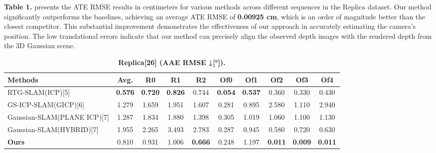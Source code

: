 \documentclass[twocolumn]{article} %
\begin{document}
\textbf{Table 1.} presents the ATE RMSE results in centimeters for
various methods across different sequences in the Replica dataset. Our
method significantly outperforms the baselines, achieving an average ATE
RMSE of \textbf{0.00925 cm}, which is an order of magnitude better than
the closest competitor. This substantial improvement demonstrates the
effectiveness of our approach in accurately estimating the camera's
position. The low translational errors indicate that our method can
precisely align the observed depth images with the rendered depth from
the 3D Gaussian scene.

\begin{table}[htbp]
\renewcommand{\thetable}{\textbf{\arabic{table}}}
\renewcommand{\tablename}{\textbf{Table}}
\centering
\caption{\textbf{Replica[26] (AAE RMSE ↓[°]).}}
\label{table:_textbf_replica_26_a}
\begin{adjustbox}{max width=\columnwidth,max height=!,center}
\begin{tabular}{lccccccccc}
\toprule
\textbf{Methods} & \textbf{Avg.} & \textbf{R0} & \textbf{R1} & \textbf{R2} & \textbf{Of0} & \textbf{Of1} & \textbf{Of2} & \textbf{Of3} & \textbf{Of4}\\
\midrule
RTG-SLAM(ICP)[5] & \cellcolor{green!30}\textbf{0.576} & \cellcolor{green!30}\textbf{0.720} & \cellcolor{green!30}\textbf{0.826} & \cellcolor{yellow!30}0.744 & \cellcolor{green!30}\textbf{0.054} & \cellcolor{green!30}\textbf{0.537} & \cellcolor{yellow!30}0.360 & \cellcolor{yellow!30}0.330 & \cellcolor{yellow!30}0.430\\
GS-ICP-SLAM(GICP)[6] & \cellcolor{lime!50}1.279 & \cellcolor{lime!50}1.659 & 1.951 & 1.607 & \cellcolor{lime!50}0.281 & \cellcolor{yellow!30}0.895 & 2.580 & 1.110 & 2.940\\
Gaussian-SLAM(PLANE ICP)[7] & 1.287 & 1.834 & \cellcolor{lime!50}1.880 & \cellcolor{lime!50}1.398 & 0.305 & 1.019 & 1.060 & 1.100 & 1.130\\
Gaussian-SLAM(HYBRID)[7] & 1.955 & 2.265 & 3.493 & 2.783 & 0.287 & \cellcolor{lime!50}0.945 & \cellcolor{lime!50}0.580 & \cellcolor{lime!50}0.720 & \cellcolor{lime!50}0.630\\
\midrule
\textbf{Ours} & \cellcolor{yellow!30}0.810 & \cellcolor{yellow!30}0.931 & \cellcolor{yellow!30}1.006 & \cellcolor{green!30}\textbf{0.666} & \cellcolor{yellow!30}0.248 & 1.197 & \cellcolor{green!30}\textbf{0.011} & \cellcolor{green!30}\textbf{0.009} & \cellcolor{green!30}\textbf{0.011}\\
\bottomrule
\end{tabular}
\end{adjustbox}
\end{table}
\end{document}

